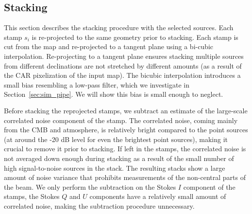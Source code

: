 \subsection{Stacking}
\label{subsec:stacking}
This section describes the stacking procedure with the selected sources.  Each stamp $s_i$ is re-projected to the same geometry prior to stacking.  Each stamp is cut from the map and re-projected to a tangent plane using a bi-cubic interpolation.  Re-projecting to a tangent plane ensures stacking multiple sources from different declinations are not stretched by different amounts (as a result of the CAR pixelization of the input map).  The bicubic interpolation introduces a small bias resembling a low-pass filter, which we investigate in Section~\ref{sec:sim_pipe}.  We will show this bias is small enough to neglect.

Before stacking the reprojected stamps, we subtract an estimate of the large-scale correlated noise component of the stamp. The correlated noise, coming mainly from the CMB and atmosphere, is relatively bright compared to the point sources (at around the -20 dB level for even the brightest point sources), making it crucial to remove it prior to stacking.  If left in the stamps, the correlated noise is not averaged down enough during stacking as a result of the small number of high signal-to-noise sources in the stack. The resulting stacks show a large amount of noise variance that prohibits measurements of the non-central parts of the beam. We only perform the subtraction on the Stokes $I$ component of the stamps, the Stokes $Q$ and $U$ components have a relatively small amount of correlated noise, making the subtraction procedure unnecessary.

